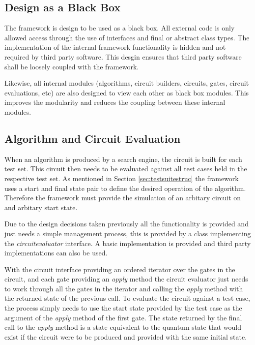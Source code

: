 \subsection{Design as a Black Box}
\label{sec:thirdpartyblackbox}
The framework is design to be used as a black box.
All external code is only allowed access through the use of interfaces and final or abstract class types.
The implementation of the internal framework functionality is hidden and not required by third party software.
This desgin ensures that third party software shall be loosely coupled with the framework.

Likewise, all internal modules (algorithms, circuit builders, circuits, gates, circuit evaluations, etc) are also designed to view each other as black box modules.
This improves the modularity and reduces the coupling between these internal modules.

\subsection{Algorithm and Circuit Evaluation}
\label{sec:cireval}
When an algorithm is produced by a search engine, the circuit is built for each test set.
This circuit then needs to be evaluated against all test cases held in the respective test set.
As mentioned in Section \ref{sec:testsuitestruc} the framework uses a start and final state pair to define the desired operation of the algorithm.
Therefore the framework must provide the simulation of an arbitary circuit on and arbitary start state.

Due to the design decisions taken previously all the functionality is provided and just needs a simple management process, this is provided by a class implementing the \emph{circuitevaluator} interface.
A basic implementation is provided and third party implementations can also be used.

With the circuit interface providing an ordered iterator over the gates in the circuit, and each gate providing an \emph{apply} method the circuit evaluator just needs to work through all the gates in the iterator and calling the \emph{apply} method with the returned state of the previous call.
To evaluate the circuit against a test case, the process simply needs to use the start state provided by the test case as the argument of the \emph{apply} method of the first gate.
The state returned by the final call to the \emph{apply} method is a state equivalent to the quantum state that would exist if the circuit were to be produced and provided with the same initial state.

